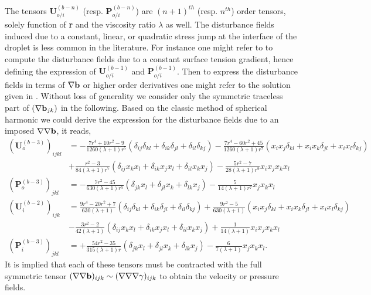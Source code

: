 The tensors $\textbf{U}^{(b-n)}_{o/i}$ (resp. $\textbf{P}^{(b-n)}_{o/i}$) are $(n+1)^{th}$ (resp. $n^{th}$) order tensors, solely function of \textbf{r} and the viscosity ratio $\lambda$ as well. 
The disturbance fields induced due to a constant, linear, or quadratic stress jump at the interface of the droplet is less common in the literature. 
For instance one might refer to \citet{Subramanian_1985,leal2007advanced} to compute the disturbance fields due to a constant surface tension gradient, hence defining the expression of  $\textbf{U}_{o/i}^{(b-1)}$ and $\textbf{P}_{o/i}^{(b-1)}$. 
Then to express the disturbance fields in terms of $\mathbf{\nabla} \textbf{b}$ or higher order derivatives one might refer to the solution given in \citet[Appendix C]{raja2010inertial}.
Without loss of generality we consider only the symmetric traceless part of $(\mathbf{\nabla} \textbf{b}_{jk})$ in the following. 
Based on the classic method of spherical harmonic \citep[chapter 8]{leal2007advanced} we could derive the expression for the disturbance fields due to an imposed $\mathbf{\nabla}\mathbf{\nabla} \textbf{b}$, it reads,
\begin{align*}
    (\textbf{U}_o^{(b-3)})_{ijkl}
    &=
    -\frac{7r^4+10r^2-9}{1260(\lambda+1)r^5}(
        \delta_{ij}\delta_{kl}
        + \delta_{ik}\delta_{jl}
        + \delta_{il}\delta_{kj}
        )
    -\frac{7r^4-60r^2+45}{1260(\lambda+1)r^7}(
        x_ix_j\delta_{kl}
        + x_ix_k\delta_{jl}
        + x_ix_l\delta_{kj}
        )\\
    &+ \frac{r^2 -3}{84(\lambda +1)r^7}(
        \delta_{ij}x_kx_l
        + \delta_{ik}x_jx_l
        + \delta_{il}x_kx_j
    )
    - \frac{5r^2 - 7}{28(\lambda+1)r^9}x_ix_jx_kx_l
    \\
    (\textbf{P}_o^{(b-3)})_{jkl}
    &=
    -\frac{7r^2 - 45}{630(\lambda+1)r^5}(
        \delta_{jk}x_l
        + \delta_{jl}x_k
        + \delta_{lk}x_j
    )
    - \frac{5}{14(\lambda+1)r^7}x_jx_kx_l
    \\
    (\textbf{U}_i^{(b-2)})_{ijk}
    &=
    \frac{9r^4-20r^2+7}{630(\lambda+1)}(
        \delta_{ij}\delta_{kl}
        + \delta_{ik}\delta_{jl}
        + \delta_{il}\delta_{kj}
    )
    +\frac{9r^2-5}{630(\lambda+1)}(
        x_ix_j\delta_{kl}
        + x_ix_k\delta_{jl}
        + x_ix_l\delta_{kj}
        )\\
    &- \frac{3r^2-2}{42(\lambda +1)}(
        \delta_{ij}x_kx_l
        + \delta_{ik}x_jx_l
        + \delta_{il}x_kx_j
    )
    + \frac{1}{14(\lambda+1)}x_ix_jx_kx_l
    \\
    (\textbf{P}_i^{(b-3)})_{jkl}
    &=
    +\frac{54r^2 - 35}{315(\lambda+1)r}(
        \delta_{jk}x_l
        + \delta_{jl}x_k
        + \delta_{lk}x_j
    )
    - \frac{6}{7(\lambda+1)}x_jx_kx_l. 
\end{align*}
It is implied that each of these tensors must be contracted with the full symmetric tensor $(\mathbf{\nabla}\mathbf{\nabla}\textbf{b})_{ijk} \sim (\mathbf{\nabla}\mathbf{\nabla}\mathbf{\nabla}\gamma)_{ijk}$ to obtain the velocity or pressure fields. 

